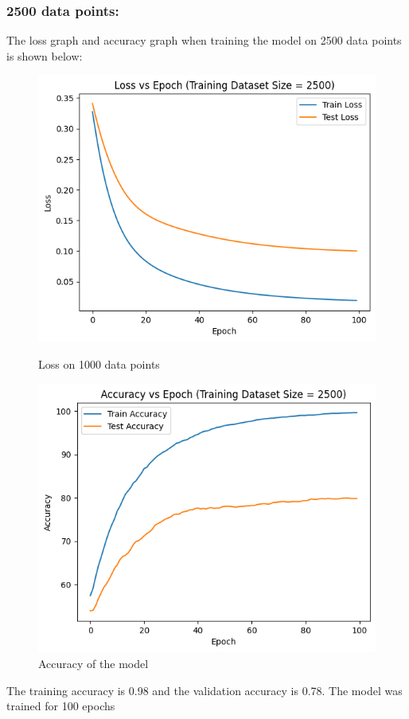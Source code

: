 \documentclass{article}
\begin{document}
\subsubsection*{2500 data points:}
The loss graph and accuracy graph when training the model on 2500 data points is shown below:
\begin{figure}[h!]
    \centering
    \begin{minipage}{0.45\textwidth}
        \centering
        \includegraphics[width=1\textwidth]{output2500.png} %
        \caption{Loss on 1000 data points}
    \end{minipage}\hfill
    \begin{minipage}{0.45\textwidth}
        \centering
        \includegraphics[width=1\textwidth]{acc2500.png} %
        \caption{Accuracy of the model}
    \end{minipage}
\end{figure}
\newline The training accuracy is 0.98 and the validation accuracy is 0.78. The model was trained for 100 epochs
\end{document}
